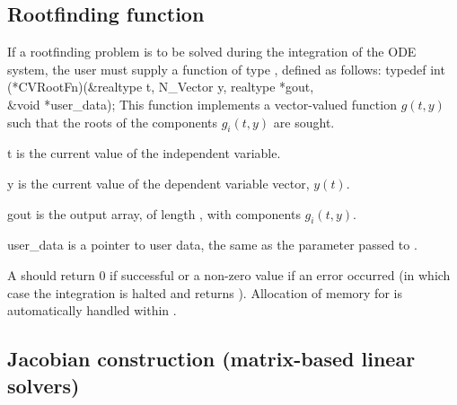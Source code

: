 \subsection{Rootfinding function}\label{ss:rootFn}
If a rootfinding problem is to be solved during the integration of the ODE system,
the user must supply a {\CC} function of type , defined as follows:
{
  typedef int (*CVRootFn)(&realtype t, N\_Vector y, realtype *gout, \\
                          &void *user\_data);
}
{
  This function implements a vector-valued function $g(t,y)$ such that the roots of
  the  components $g_i(t,y)$ are sought.
}
{
  \begin{args}
  \item[t]
    is the current value of the independent variable.
  \item[y]
    is the current value of the dependent variable vector, $y(t)$.
  \item[gout]
    is the output array, of length , with components $g_i(t,y)$.
  \item[user\_data]
    is a pointer to user data, the same as the 
    parameter passed to .
  \end{args}
}
{
  A  should return 0 if successful or a non-zero value if
  an error occurred (in which case the integration is halted and  returns
  ).
}
{
  Allocation of memory for  is automatically handled within {\cvode}.
}


\subsection{Jacobian construction (matrix-based linear solvers)}
\label{ss:jacFn}

